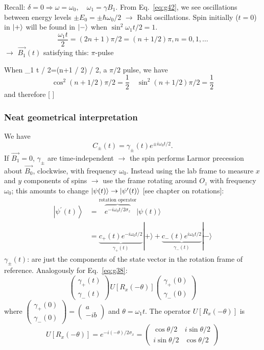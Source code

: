 \documentclass[12pt]{article}
\begin{document}

Recall: $\delta = 0 \Rightarrow \omega = \omega_0,\quad \omega_1 = \gamma B_1$.
From Eq.~\eqref{eq:g42}, we see oscillations between energy
levels $\pm E_0 = \pm \hbar\omega_0/2$ $\to$ Rabi oscillations.
Spin initially ($t=0$) in $\ket{+}$ will be
found in $\ket{-}$ when $\sin ^{2} \omega_{1} t / 2=1$.
\[
\frac{\omega_{1} t}{2}=(2 n+1) \pi / 2=(n+1 / 2) \pi, n=0,1, \ldots
\]
$\to$ $\vec{B_1}(t)$ satisfying this: $\pi$-pulse

When 
\be
\omega_{1} t / 2=(n+1 / 2) \pi / 2,
\ee
a $\pi/2$ pulse, we have
\[
\cos ^{2}(n+1 / 2) \pi / 2=\frac{1}{2} \quad 
\sin ^{2}(n+1 / 2) \pi / 2=\frac{1}{2}
\]
and therefore
\be
{}
[\ket{+} \pm \ket{-}]
\ee

\subsubsection{Neat geometrical interpretation}

We have
\[
C_{\pm}(t)=\gamma_{\pm}(t) e^{\pm i \omega_{0} t / 2}.
\]
If $\vec{B_1} = 0$, $\gamma_\pm$ are time-independent 
$\to$ the spin performs Larmor precession
about $\vec{B_0}$, clockwise, with frequency $\omega_0$.
Instead using the lab frame to measure $x$ and $y$
components of spins $\to$ use the frame rotating
around $O_z$ with frequency $\omega_0$; this amounts
to change $\ket{\psi(t)} \to \ket{\psi^\prime(t)}$ [see chapter on rotations]:
\[
\begin{aligned}
\left|\psi^{\prime}(t)\right\rangle
&=\overbrace{e^{-i \omega_{0} t / 2 \sigma_{z}}}%
^{\text{rotation operator}}
|\psi(t)\rangle\\
&=\underbrace{c_{+}(t) e^{-i \omega_{0} t / 2}}%
_{\gamma_+(t)}|+\rangle
 +\underbrace{c_{-}(t) e^{i \omega_{0} t / 2}}%
_{\gamma_-(t)}|-\rangle
\end{aligned}
\]
$\gamma_\pm(t)$: are just the components of 
the state vector in the rotation
frame of reference.
Analogously for Eq.~\eqref{eq:g38}:
\[
\begin{pmatrix}
\gamma_+(t)\\
\gamma_-(t)
\end{pmatrix}
U[R_x(-\theta)]
\begin{pmatrix}
\gamma_+(0)\\
\gamma_-(0)
\end{pmatrix}
\]
where $\begin{pmatrix}
\gamma_+(0)\\
\gamma_-(0)
\end{pmatrix} = 
\begin{pmatrix}
a\\
-ib
\end{pmatrix}
$ and $\theta = \omega_1 t$.
The operator $U[R_x(-\theta)]$ is
\[
U[R_x(-\theta)] = e^{-i(-\theta)/2 \sigma_x} = 
\begin{pmatrix}
\cos \theta/2 & i \sin \theta/2\\
i \sin \theta/2 & \cos \theta/2
\end{pmatrix}
\]
\end{document}
